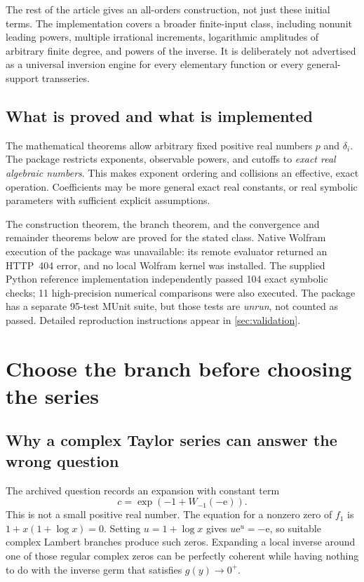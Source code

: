 \documentclass[11pt,a4paper]{article}
\numberwithin{equation}{section}
\theoremstyle{definition}\newtheorem{definition}[theorem]{Definition}
\theoremstyle{remark}\newtheorem{remark}[theorem]{Remark}
\newcommand{\e}{\mathrm e}
\begin{document}
The rest of the article gives an all-orders construction, not just these
initial terms. The implementation covers a broader finite-input class,
including nonunit leading powers, multiple irrational increments,
logarithmic amplitudes of arbitrary finite degree, and powers of the
inverse. It is deliberately not advertised as a universal inversion
engine for every elementary function or every general-support transseries.

\subsection{What is proved and what is implemented}

The mathematical theorems allow arbitrary fixed positive real numbers
$p$ and $\delta_i$. The package restricts exponents, observable powers,
and cutoffs to \emph{exact real algebraic numbers}. This makes exponent
ordering and collisions an effective, exact operation. Coefficients may
be more general exact real constants, or real symbolic parameters with
sufficient explicit assumptions.

The construction theorem, the branch theorem, and the convergence and
remainder theorems below are proved for the stated class. Native Wolfram
execution of the package was unavailable: its remote evaluator returned
an HTTP~404 error, and no local Wolfram kernel was installed. The supplied
Python reference implementation independently passed 104 exact symbolic
checks; 11 high-precision numerical comparisons were also executed.
The package has a separate 95-test MUnit suite, but those tests are
\emph{unrun}, not counted as passed. Detailed reproduction instructions
appear in \cref{sec:validation}.

\section{Choose the branch before choosing the series}
\label{sec:branch}

\subsection{Why a complex Taylor series can answer the wrong question}

The archived question records an expansion with constant term
\[
 c=\exp\!\left(-1+W_{-1}(-\e)\right).
\]
This is not a small positive real number. The equation for a nonzero zero
of $f_1$ is $1+x(1+\log x)=0$. Setting $u=1+\log x$ gives
$u\e^u=-\e$, so suitable complex Lambert branches produce such zeros.
Expanding a local inverse around one of those regular complex zeros can
be perfectly coherent while having nothing to do with the inverse germ
that satisfies $g(y)\to0^+$.
\end{document}
